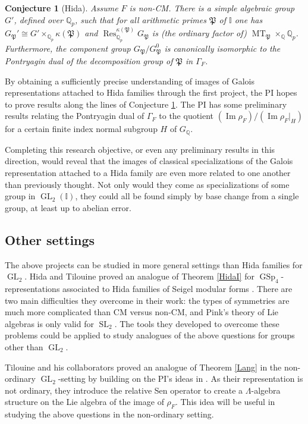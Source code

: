 \documentclass[11pt]{amsart}
\newtheorem{conj}{Conjecture}
\theoremstyle{definition}
\theoremstyle{remark}
\DeclareMathOperator{\MT}{MT}
\DeclareMathOperator{\Res}{Res}
\def\I{\mathbb{I}}
\def\Pp{\mathfrak{P}}
\def\Q{\mathbb{Q}}
\DeclareMathOperator{\GL}{GL}
\DeclareMathOperator{\GSp}{GSp}
\DeclareMathOperator{\im}{Im}
\DeclareMathOperator{\SL}{SL}
\begin{document}
\begin{conj}[Hida]\label{p-adic MT}
Assume $F$ is non-CM.  There is a simple algebraic group $G'$, defined over $\Q_p$, such that for all arithmetic primes $\Pp$ of $\I$ one has $G_\Pp' \cong G' \times_{\Q_p} \kappa(\Pp)$ and $\Res_{\Q_p}^{\kappa(\Pp)} G_\Pp$ is (the ordinary factor of) $\MT_\Pp \times_\Q \Q_p$.  Furthermore, the component group $G_\Pp/G_\Pp^0$ is canonically isomorphic to the Pontryagin dual of the decomposition group of $\Pp$ in $\Gamma_F$.
\end{conj} 

By obtaining a sufficiently precise understanding of images of Galois representations attached to Hida families through the first project, the PI hopes to prove results along the lines of Conjecture \ref{p-adic MT}.  The PI has some preliminary results relating the Pontryagin dual of $\Gamma_F$ to the quotient $(\im \rho_F)/(\im \rho_F|_H)$ for a certain finite index normal subgroup $H$ of $G_\Q$.

Completing this research objective, or even any preliminary results in this direction, would reveal that the images of classical specializations of the Galois representation attached to a Hida family are even more related to one another than previously thought.  Not only would they come as specializations of some group in $\GL_2(\I)$, they could all be found simply by base change from a single group, at least up to abelian error.

\subsection*{Other settings}
The above projects can be studied in more general settings than Hida families for $\GL_2$.  Hida and Tilouine proved an analogue of Theorem \ref{HidaI} for $\GSp_4$-representations associated to Hida families of Seigel modular forms \cite{HidaTilouine15}.  There are two main difficulties they overcome in their work: the types of symmetries are much more complicated than CM versus non-CM, and Pink's theory of Lie algebras is only valid for $\SL_2$.  The tools they developed to overcome these problems could be applied to study analogues of the above questions for groups other than $\GL_2$.  

Tilouine and his collaborators proved an analogue of Theorem \ref{Lang} in the non-ordinary $\GL_2$-setting \cite{CIT15} by building on the PI's ideas in \cite{Lang15}.  As their representation is not ordinary, they introduce the relative Sen operator to create a $\Lambda$-algebra structure on the Lie algebra of the image of $\rho_F$.  This idea will be useful in studying the above questions in the non-ordinary setting. 
\end{document}
